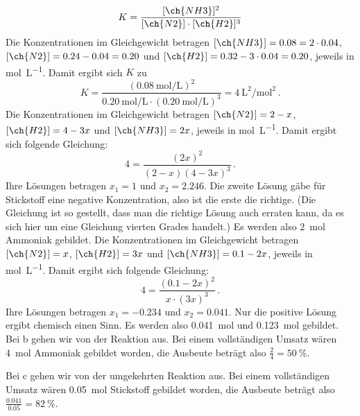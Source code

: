 \documentclass[DIV11]{scrartcl}
\begin{document}
\begin{solution}
  \begin{tasks}
    \task \[ K = \frac{[\ch{NH3}]^2}{[\ch{N2}]\cdot[\ch{H2}]^3} \]
    \task Die Konzentrationen im Gleichgewicht betragen
      $[\ch{NH3}]=0.08=2\cdot0.04$, $[\ch{N2}]=0.24-0.04=0.20$ und
      $[\ch{H2}]=0.32-3\cdot0.04=0.20$, jeweils in \si{\mole\per\liter}. Damit
      ergibt sich $K$ zu
      \[
        K = \frac
              {(\SI{0.08}{\mole\per\liter})^2}
              {\SI{0.20}{\mole\per\liter}\cdot(\SI{0.20}{\mole\per\liter})^3}
          = \SI{4}{\liter\squared\per\mole\squared} \,.
      \]
    \task Die Konzentrationen im Gleichgewicht betragen $[\ch{N2}]=2-x$,
      $[\ch{H2}]=4-3x$ und $[\ch{NH3}]=2x$, jeweils in \si{\mole\per\liter}.
      Damit ergibt sich folgende Gleichung:
      \[ 4 = \frac{(2x)^2}{(2-x)(4-3x)^3} \,. \]
      Ihre Lösungen betragen $x_1=1$ und $x_2=2.246$.  Die zweite Lösung gäbe
      für Stickstoff eine negative Konzentration, also ist die erste die
      richtige.  (Die Gleichung ist so gestellt, dass man die richtige Lösung
      auch erraten kann, da es sich hier um eine Gleichung vierten Grades
      handelt.)  Es werden also \SI{2}{\mole} Ammoniak gebildet.
    \task
      Die Konzentrationen im Gleichgewicht betragen $[\ch{N2}]=x$,
      $[\ch{H2}]=3x$ und $[\ch{NH3}]=0.1-2x$, jeweils in \si{\mole\per\liter}.
      Damit ergibt sich folgende Gleichung:
      \[ 4 = \frac{(0.1-2x)^2}{x\cdot(3x)^3} \,. \]
      Ihre Lösungen betragen $x_1=-0.234$ und $x_2=0.041$.  Nur die positive
      Lösung ergibt chemisch einen Sinn.  Es werden also \SI{0.041}{\mole}
       und \SI{0.123}{\mole}  gebildet.
    \task Bei b gehen wir von der Reaktion  aus.  Bei
      einem vollständigen Umsatz wären \SI{4}{\mole} Ammoniak gebildet worden,
      die Ausbeute beträgt also $\frac{2}{4}=\SI{50}{\percent}$.

      Bei c gehen wir von der umgekehrten Reaktion 
      aus.  Bei einem vollständigen Umsatz wären \SI{0.05}{\mole} Stickstoff
      gebildet worden, die Ausbeute beträgt also $\frac{0.041}{0.05} =
      \SI{82}{\percent}$.
  \end{tasks}
\end{solution}
\end{document}
